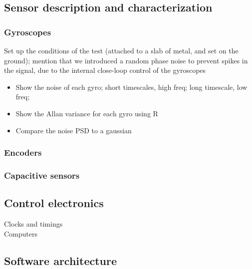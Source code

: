 \subsection{Sensor description and characterization}
\subsubsection{Gyroscopes}
Set up the conditions of the test (attached to a slab of metal, and set on the ground); mention that we introduced a random phase noise to prevent spikes in the signal, due to the internal close-loop control of the gyroscopes
\begin{itemize}
\item Show the noise of each gyro; short timescales, high freq; long timescale, low freq;
\item Show the Allan variance for each gyro using R
\item Compare the noise PSD to a gaussian
\end{itemize}
\subsubsection{Encoders}
\subsubsection{Capacitive sensors}
\subsubsection{}
\subsection{Control electronics}
Clocks and timings \\
Computers
\subsection{Software architecture}
